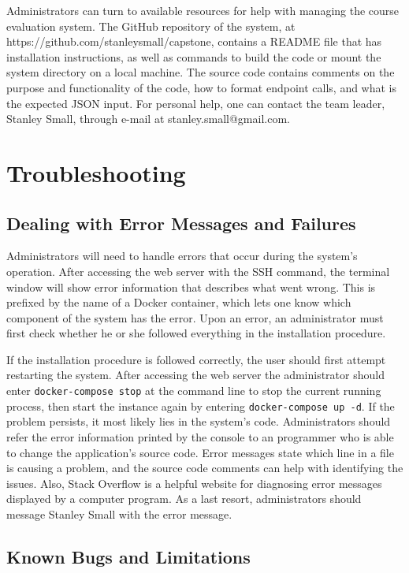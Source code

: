\documentclass{article}
\begin{document}
Administrators can turn to available resources for help with managing the course evaluation system. The GitHub repository of the system, at https://github.com/stanleysmall/capstone, contains a README file that has installation instructions, as well as commands to build the code or mount the system directory on a local machine. The source code contains comments on the purpose and functionality of the code, how to format endpoint calls, and what is the expected JSON input. For personal help, one can contact the team leader, Stanley Small, through e-mail at stanley.small@gmail.com.

\section{Troubleshooting}

\subsection{Dealing with Error Messages and Failures}

Administrators will need to handle errors that occur during the system's operation. After accessing the web server with the SSH command, the terminal window will show error information that describes what went wrong. This is prefixed by the name of a Docker container, which lets one know which component of the system has the error. Upon an error, an administrator must first check whether he or she followed everything in the installation procedure.

If the installation procedure is followed correctly, the user should first attempt restarting the system. After accessing the web server the administrator should enter \verb|docker-compose stop| at the command line to stop the current running process, then start the instance again by entering \verb|docker-compose up -d|.  If the problem persists, it most likely lies in the system's code. Administrators should refer the error information printed by the console to an programmer who is able to change the application's source code. Error messages state which line in a file is causing a problem, and the source code comments can help with identifying the issues. Also, Stack Overflow is a helpful website for diagnosing error messages displayed by a computer program. As a last resort, administrators should message Stanley Small with the error message.

\subsection{Known Bugs and Limitations}
\end{document}
